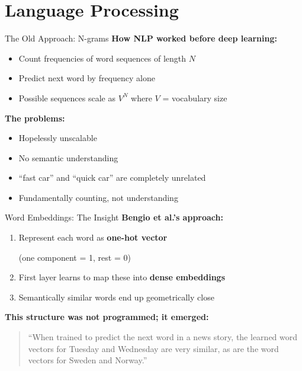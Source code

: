 \section{Language Processing}

\begin{frame}{The Old Approach: N-grams}
    \textbf{How NLP worked before deep learning:}
    
    \vspace{1em}
    \begin{itemize}
        \item Count frequencies of word sequences of length $N$
        \item Predict next word by frequency alone
        \item Possible sequences scale as $V^N$ where $V$ = vocabulary size
    \end{itemize}
    
    \vspace{1em}
    \textbf{The problems:}
    \begin{itemize}
        \item Hopelessly unscalable
        \item No semantic understanding
        \item ``fast car'' and ``quick car'' are completely unrelated
        \item Fundamentally counting, not understanding
    \end{itemize}
\end{frame}

\begin{frame}{Word Embeddings: The Insight}
    \textbf{Bengio et al.'s approach:}
    
    \vspace{1em}
    \begin{enumerate}
        \item Represent each word as \textbf{one-hot vector}
        
        (one component = 1, rest = 0)
        
        \item First layer learns to map these into \textbf{dense embeddings}
        \item Semantically similar words end up geometrically close
    \end{enumerate}
    
    \vspace{1em}
    
    \textbf{This structure was not programmed; it emerged:}
    \begin{quote}
        \small``When trained to predict the next word in a news story, the learned word vectors for Tuesday and Wednesday are very similar, as are the word vectors for Sweden and Norway.''
    \end{quote}
\end{frame}

